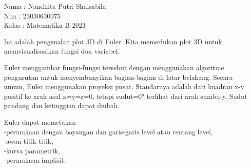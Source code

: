 \documentclass{article}
\begin{document}
\begin{eulernotebook}
\begin{eulercomment}
Nama : Nandhita Putri Shalsabila\\
Nim : 23030630075\\
Kelas : Matematika B 2023


\begin{eulercomment}
\begin{eulercomment}
Ini adalah pengenalan plot 3D di Euler. Kita memerlukan plot 3D untuk
memvisualisasikan fungsi dua variabel.

Euler menggambar fungsi-fungsi tersebut dengan menggunakan algoritme
pengurutan untuk menyembunyikan bagian-bagian di latar belakang.
Secara umum, Euler menggunakan proyeksi pusat. Standarnya adalah dari
kuadran x-y positif ke arah asal x=y=z=0, tetapi sudut=0° terlihat
dari arah sumbu-y. Sudut pandang dan ketinggian dapat diubah.

Euler dapat memetakan\\
-permukaan dengan bayangan dan garis-garis level atau rentang level,\\
-awan titik-titik,\\
-kurva parametrik,\\
-permukaan implisit.


\end{eulercomment}
\end{eulercomment}
\end{eulercomment}
\end{eulernotebook}
\end{document}
